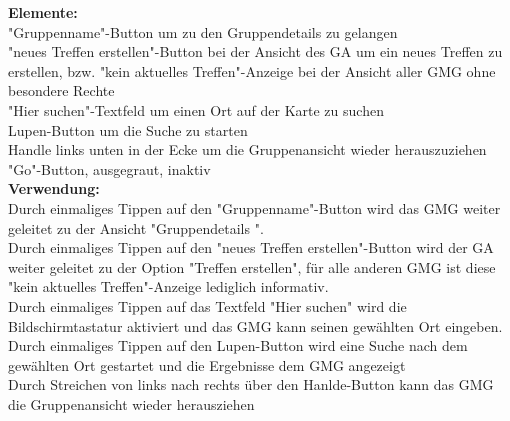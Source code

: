 \textbf{Elemente:}\\
"Gruppenname"-Button um zu den Gruppendetails zu gelangen\\
"neues Treffen erstellen"-Button bei der Ansicht des GA um ein neues Treffen zu erstellen, bzw. "kein aktuelles Treffen"-Anzeige bei der Ansicht aller GMG ohne besondere Rechte\\
"Hier suchen"-Textfeld um einen Ort auf der Karte zu suchen\\
Lupen-Button um die Suche zu starten\\
Handle links unten in der Ecke um die Gruppenansicht wieder herauszuziehen\\
"Go"-Button, ausgegraut, inaktiv\\
\textbf{Verwendung:}\\
Durch einmaliges Tippen auf den "Gruppenname"-Button wird das GMG weiter geleitet zu der Ansicht "Gruppendetails ".\\
Durch einmaliges Tippen auf den "neues Treffen erstellen"-Button wird der GA weiter geleitet zu der Option "Treffen erstellen", für alle anderen GMG ist diese "kein aktuelles Treffen"-Anzeige lediglich informativ.\\
Durch einmaliges Tippen auf das Textfeld "Hier suchen" wird die Bildschirmtastatur aktiviert und das GMG kann seinen gewählten Ort eingeben.\\
Durch einmaliges Tippen auf den Lupen-Button wird eine Suche nach dem gewählten Ort gestartet und die Ergebnisse dem GMG angezeigt\\
Durch Streichen von links nach rechts über den Hanlde-Button kann das GMG die Gruppenansicht wieder herausziehen\\ \\

